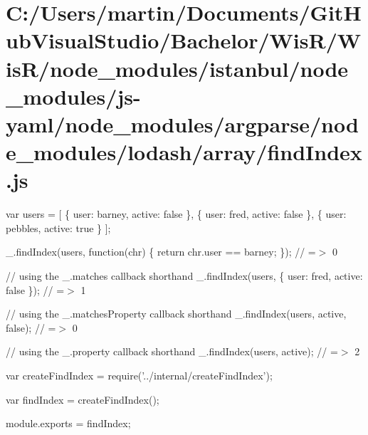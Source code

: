 \hypertarget{_c_1_2_users_2martin_2_documents_2_git_hub_visual_studio_2_bachelor_2_wis_r_2_wis_r_2node_module61f79ea4d933261c76d693852ce50516}{}\section{C\+:/\+Users/martin/\+Documents/\+Git\+Hub\+Visual\+Studio/\+Bachelor/\+Wis\+R/\+Wis\+R/node\+\_\+modules/istanbul/node\+\_\+modules/js-\/yaml/node\+\_\+modules/argparse/node\+\_\+modules/lodash/array/find\+Index.\+js}
var users = \mbox{[} \{ \textquotesingle{}user\textquotesingle{}\+: \textquotesingle{}barney\textquotesingle{}, \textquotesingle{}active\textquotesingle{}\+: false \}, \{ \textquotesingle{}user\textquotesingle{}\+: \textquotesingle{}fred\textquotesingle{}, \textquotesingle{}active\textquotesingle{}\+: false \}, \{ \textquotesingle{}user\textquotesingle{}\+: \textquotesingle{}pebbles\textquotesingle{}, \textquotesingle{}active\textquotesingle{}\+: true \} \mbox{]};

\+\_\+.\+find\+Index(users, function(chr) \{ return chr.\+user == \textquotesingle{}barney\textquotesingle{}; \}); // =$>$ 0

// using the {\ttfamily \+\_\+.\+matches} callback shorthand \+\_\+.\+find\+Index(users, \{ \textquotesingle{}user\textquotesingle{}\+: \textquotesingle{}fred\textquotesingle{}, \textquotesingle{}active\textquotesingle{}\+: false \}); // =$>$ 1

// using the {\ttfamily \+\_\+.\+matches\+Property} callback shorthand \+\_\+.\+find\+Index(users, \textquotesingle{}active\textquotesingle{}, false); // =$>$ 0

// using the {\ttfamily \+\_\+.\+property} callback shorthand \+\_\+.\+find\+Index(users, \textquotesingle{}active\textquotesingle{}); // =$>$ 2


\begin{DoxyCodeInclude}
var createFindIndex = require(\textcolor{stringliteral}{'../internal/createFindIndex'});

var findIndex = createFindIndex();

module.exports = findIndex;
\end{DoxyCodeInclude}
 